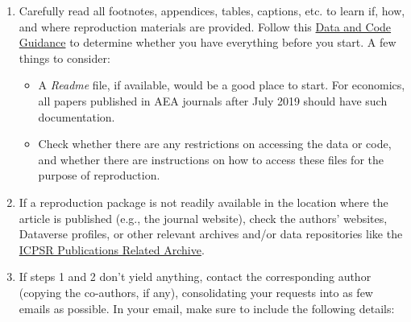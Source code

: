 \documentclass[
]{book}
\providecommand{\tightlist}{%
  \setlength{\itemsep}{0pt}\setlength{\parskip}{0pt}}
\begin{document}
\begin{enumerate}
\def\labelenumi{\arabic{enumi}.}
\item
  Carefully read all footnotes, appendices, tables, captions, etc. to learn if, how, and where reproduction materials are provided. Follow this \href{https://social-science-data-editors.github.io/guidance/Verification_guidance.html}{Data and Code Guidance} to determine whether you have everything before you start. A few things to consider:

  \begin{itemize}
  \tightlist
  \item
    A \emph{Readme} file, if available, would be a good place to start. For economics, all papers published in AEA journals after July 2019 should have such documentation.\\
  \item
    Check whether there are any restrictions on accessing the data or code, and whether there are instructions on how to access these files for the purpose of reproduction.
  \end{itemize}
\item
  If a reproduction package is not readily available in the location where the article is published (e.g., the journal website), check the authors' websites, Dataverse profiles, or other relevant archives and/or data repositories like the \href{https://www.icpsr.umich.edu/icpsrweb/}{ICPSR Publications Related Archive}.
\item
  If steps 1 and 2 don't yield anything, contact the corresponding author (copying the co-authors, if any), consolidating your requests into as few emails as possible. In your email, make sure to include the following details:


\end{enumerate}
\end{document}
